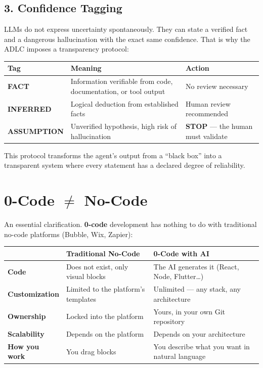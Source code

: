 \subsection*{3. Confidence Tagging}

LLMs do not express uncertainty spontaneously. They can state a verified fact and a dangerous hallucination with the exact same confidence. That is why the ADLC imposes a transparency protocol:

\begin{center}
\begin{tabular}{l l p{6cm}}
\toprule
\textbf{Tag} & \textbf{Meaning} & \textbf{Action} \\
\midrule
\textbf{FACT} & Information verifiable from code, documentation, or tool output & No review necessary \\
\textbf{INFERRED} & Logical deduction from established facts & Human review recommended \\
\textbf{ASSUMPTION} & Unverified hypothesis, high risk of hallucination & \textbf{STOP} --- the human must validate \\
\bottomrule
\end{tabular}
\end{center}

This protocol transforms the agent's output from a ``black box'' into a transparent system where every statement has a declared degree of reliability.

\section*{0-Code $\neq$ No-Code}

An essential clarification. \textbf{0-code} development has nothing to do with traditional no-code platforms (Bubble, Wix, Zapier):

\begin{center}
\begin{tabularx}{\textwidth}{l X X}
\toprule
 & \textbf{Traditional No-Code} & \textbf{0-Code with AI} \\
\midrule
\textbf{Code} & Does not exist, only visual blocks & The AI generates it (React, Node, Flutter\ldots) \\
\textbf{Customization} & Limited to the platform's templates & Unlimited --- any stack, any architecture \\
\textbf{Ownership} & Locked into the platform & Yours, in your own Git repository \\
\textbf{Scalability} & Depends on the platform & Depends on your architecture \\
\textbf{How you work} & You drag blocks & You describe what you want in natural language \\
\bottomrule
\end{tabularx}
\end{center}

